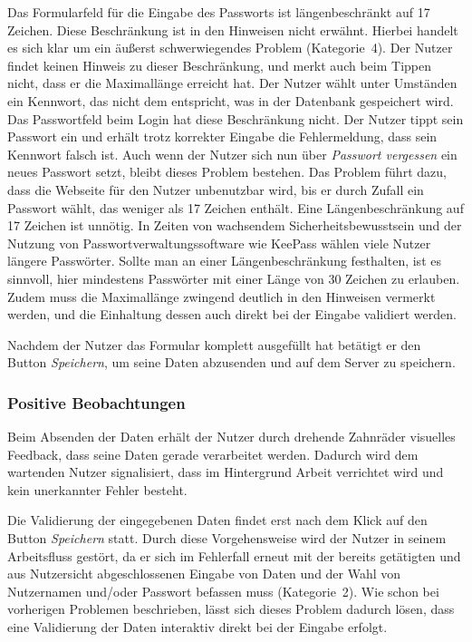 {
Das Formularfeld für die Eingabe des Passworts ist längenbeschränkt auf 17 Zeichen. Diese Beschränkung ist in den Hinweisen nicht erwähnt.
}
{
Hierbei handelt es sich klar um ein äußerst schwerwiegendes Problem (Kategorie~4). Der Nutzer findet keinen Hinweis zu dieser Beschränkung, und merkt auch beim Tippen nicht, dass er die Maximallänge erreicht hat. Der Nutzer wählt unter Umständen ein Kennwort, das nicht dem entspricht, was in der Datenbank gespeichert wird. Das Passwortfeld beim Login hat diese Beschränkung nicht. Der Nutzer tippt sein Passwort ein und erhält trotz korrekter Eingabe die Fehlermeldung, dass sein Kennwort falsch ist. Auch wenn der Nutzer sich nun über \emph{Passwort vergessen} ein neues Passwort setzt, bleibt dieses Problem bestehen. Das Problem führt dazu, dass die Webseite für den Nutzer unbenutzbar wird, bis er durch Zufall ein Passwort wählt, das weniger als 17 Zeichen enthält.
}
{
Eine Längenbeschränkung auf 17 Zeichen ist unnötig. In Zeiten von wachsendem Sicherheitsbewusstsein und der Nutzung von Passwortverwaltungssoftware wie KeePass wählen viele Nutzer längere Passwörter. Sollte man an einer Längenbeschränkung festhalten, ist es sinnvoll, hier mindestens Passwörter mit einer Länge von 30 Zeichen zu erlauben. Zudem muss die Maximallänge zwingend deutlich in den Hinweisen vermerkt werden, und die Einhaltung dessen auch direkt bei der Eingabe validiert werden.
}
\label{prob:frei:passwortlaenge}

Nachdem der Nutzer das Formular komplett ausgefüllt hat betätigt er den Button \emph{Speichern}, um seine Daten abzusenden und auf dem Server zu speichern.

\subsubsection*{Positive Beobachtungen}
\label{subsubsec:freischaltung_absenden_positiv}
Beim Absenden der Daten erhält der Nutzer durch drehende Zahnräder visuelles Feedback, dass seine Daten gerade verarbeitet werden. Dadurch wird dem wartenden Nutzer signalisiert, dass im Hintergrund Arbeit verrichtet wird und kein unerkannter Fehler besteht.

{
Die Validierung der eingegebenen Daten findet erst nach dem Klick auf den Button \emph{Speichern} statt.
}
{
Durch diese Vorgehensweise wird der Nutzer in seinem Arbeitsfluss gestört, da er sich im Fehlerfall erneut mit der bereits getätigten und aus Nutzersicht abgeschlossenen Eingabe von Daten und der Wahl von Nutzernamen und/oder Passwort befassen muss (Kategorie~2).
}
{
Wie schon bei vorherigen Problemen beschrieben, lässt sich dieses Problem dadurch lösen, dass eine Validierung der Daten interaktiv direkt bei der Eingabe erfolgt.
}
\label{prob:frei:validierung}

